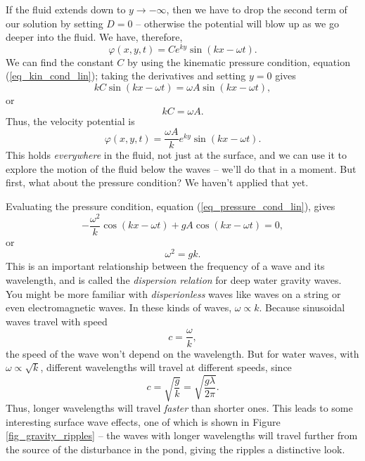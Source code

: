 If the fluid extends down to $y \to -\infty$, then we have to drop the second term of our solution by setting $D = 0$ -- otherwise the potential will blow up as we go deeper into the fluid.  We have, therefore, 
\[
\varphi(x, y, t) = C e^{ky} \sin (kx - \omega t).
\]
We can find the constant $C$ by using the kinematic pressure condition, equation (\ref{eq_kin_cond_lin}); taking the derivatives and setting $y = 0$ gives
\[
kC \sin(kx - \omega t) = \omega A \sin (kx - \omega t),
\]
or
\begin{equation}
kC = \omega A.
\end{equation}
Thus, the velocity potential is
\begin{equation}
\varphi(x, y, t) = \frac{\omega A}{k} e^{ky} \sin (kx - \omega t).
\end{equation}
This holds \emph{everywhere} in the fluid, not just at the surface, and we can use it to explore the motion of the fluid below the waves -- we'll do that in a moment.  But first, what about the pressure condition?  We haven't applied that yet.

Evaluating the pressure condition, equation (\ref{eq_pressure_cond_lin}), gives
\[
-\frac{\omega^2}{k} \cos(kx - \omega t) + gA \cos(kx - \omega t) = 0,
\]
or
\begin{equation}
\label{eq_disp_relation}
\boxed{
\omega^2 = gk.
}
\end{equation}
This is an important relationship between the frequency of a wave and its wavelength, and is called the \emph{dispersion relation} for deep water gravity waves.  You might be more familiar with \emph{disperionless} waves like waves on a string or even electromagnetic waves.  In these kinds of waves, $\omega \propto k$.  Because sinusoidal waves travel with speed
\begin{equation}
c = \frac{\omega}{k},
\end{equation}
the speed of the wave won't depend on the wavelength.  But for water waves, with $\omega \propto \sqrt{k}$, different wavelengths will travel at different speeds, since
\[
c = \sqrt{\frac{g}{k}} = \sqrt{\frac{g\lambda}{2\pi}}.
\]
Thus, longer wavelengths will travel \emph{faster} than shorter ones.  This leads to some interesting surface wave effects, one of which is shown in Figure \ref{fig_gravity_ripples} -- the waves with longer wavelengths will travel further from the source of the disturbance in the pond, giving the ripples a distinctive look.

